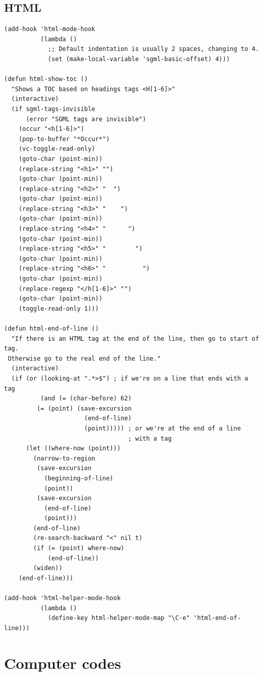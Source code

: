 \documentclass[10pt]{article}
\def\C{\mathbb{C}}
\begin{document}
\subsection{HTML}
\label{sec:org3369c52}
\begin{verbatim}
(add-hook 'html-mode-hook
          (lambda ()
            ;; Default indentation is usually 2 spaces, changing to 4.
            (set (make-local-variable 'sgml-basic-offset) 4)))

(defun html-show-toc ()
  "Shows a TOC based on headings tags <H[1-6]>"
  (interactive)
  (if sgml-tags-invisible
      (error "SGML tags are invisible")
    (occur "<h[1-6]>")
    (pop-to-buffer "*Occur*")
    (vc-toggle-read-only)
    (goto-char (point-min))
    (replace-string "<h1>" "")
    (goto-char (point-min))
    (replace-string "<h2>" "  ")
    (goto-char (point-min))
    (replace-string "<h3>" "    ")
    (goto-char (point-min))
    (replace-string "<h4>" "      ")
    (goto-char (point-min))
    (replace-string "<h5>" "        ")
    (goto-char (point-min))
    (replace-string "<h6>" "          ")
    (goto-char (point-min))
    (replace-regexp "</h[1-6]>" "")
    (goto-char (point-min))
    (toggle-read-only 1)))

(defun html-end-of-line ()
  "If there is an HTML tag at the end of the line, then go to start of tag.
 Otherwise go to the real end of the line."
  (interactive)
  (if (or (looking-at ".*>$") ; if we're on a line that ends with a tag
          (and (= (char-before) 62)
         (= (point) (save-excursion
                      (end-of-line)
                      (point))))) ; or we're at the end of a line
                                  ; with a tag
      (let ((where-now (point)))
        (narrow-to-region
         (save-excursion
           (beginning-of-line)
           (point))
         (save-excursion
           (end-of-line)
           (point)))
        (end-of-line)
        (re-search-backward "<" nil t)
        (if (= (point) where-now)
            (end-of-line))
        (widen))
    (end-of-line)))

(add-hook 'html-helper-mode-hook
          (lambda ()
            (define-key html-helper-mode-map "\C-e" 'html-end-of-line)))
\end{verbatim}
\section{Computer codes}
\label{sec:org79c6256}
\end{document}
